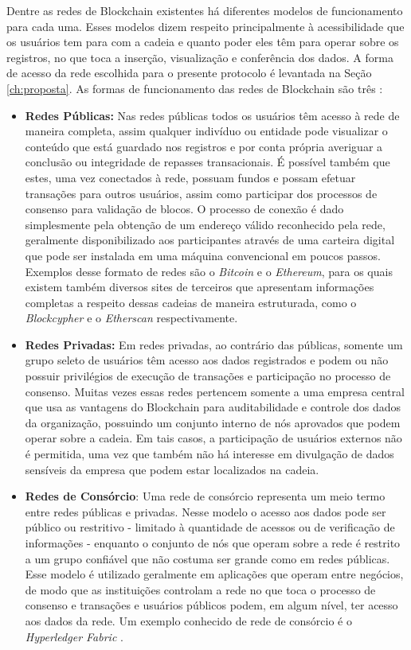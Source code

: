 Dentre as redes de Blockchain existentes há diferentes modelos de funcionamento para cada uma. Esses modelos dizem respeito principalmente à acessibilidade que os usuários tem para com a cadeia e quanto poder eles têm para operar sobre os registros, no que toca a inserção, visualização e conferência dos dados. A forma de acesso da rede escolhida para o presente protocolo é levantada na Seção \ref{ch:proposta}. As formas de funcionamento das redes de Blockchain são três \cite{blockchain:formas_redes}:
\begin{itemize}
    \item \textbf{Redes Públicas:} Nas redes públicas todos os usuários têm acesso à rede de maneira completa, assim qualquer indivíduo ou entidade pode visualizar o conteúdo que está guardado nos registros e por conta própria averiguar a conclusão ou integridade de repasses transacionais. É possível também que estes, uma vez conectados à rede, possuam fundos e possam efetuar transações para outros usuários, assim como participar dos processos de consenso para validação de blocos. O processo de conexão é dado simplesmente pela obtenção de um endereço válido reconhecido pela rede, geralmente disponibilizado aos participantes através de uma carteira digital que pode ser instalada em uma máquina convencional em poucos passos. Exemplos desse formato de redes são o \textit{Bitcoin} e o \textit{Ethereum}, para os quais existem também diversos sites de terceiros que apresentam informações completas a respeito dessas cadeias de maneira estruturada, como o \textit{Blockcypher} \cite{blockchain:blockcypher} e o \textit{Etherscan} \cite{blockchain:etherscan} respectivamente.
    \item \textbf{Redes Privadas:} Em redes privadas, ao contrário das públicas, somente um grupo seleto de usuários têm acesso aos dados registrados e podem ou não possuir privilégios de execução de transações e participação no processo de consenso. Muitas vezes essas redes pertencem somente a uma empresa central que usa as vantagens do Blockchain para auditabilidade e controle dos dados da organização, possuindo um conjunto interno de nós aprovados que podem operar sobre a cadeia. Em tais casos, a participação de usuários externos não é permitida, uma vez que também não há interesse em divulgação de dados sensíveis da empresa que podem estar localizados na cadeia.
    \item\textbf{Redes de Consórcio}: Uma rede de consórcio representa um meio termo entre redes públicas e privadas. Nesse modelo o acesso aos dados pode ser público ou restritivo - limitado à quantidade de acessos ou de verificação de informações - enquanto o conjunto de nós que operam sobre a rede é restrito a um grupo confiável que não costuma ser grande como em redes públicas. Esse modelo é utilizado geralmente em aplicações que operam entre negócios, de modo que as instituições controlam a rede no que toca o processo de consenso e transações e usuários públicos podem, em algum nível, ter acesso aos dados da rede. Um exemplo conhecido de rede de consórcio é o \textit{Hyperledger Fabric} \cite{blockchain:hyperledger}.
\end{itemize}

